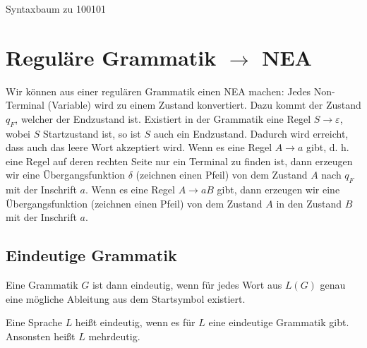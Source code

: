 \documentclass{lehramt-informatik-haupt}
\begin{document}
Syntaxbaum zu 100101
\begin{center}
\end{center}

%

\section{Reguläre Grammatik $\rightarrow$ NEA}

Wir können aus einer regulären Grammatik einen NEA machen: Jedes
Non-Terminal (Variable) wird zu einem Zustand konvertiert. Dazu kommt
der Zustand $q_{F}$, welcher der Endzustand ist. Existiert in der
Grammatik eine Regel $S \rightarrow \varepsilon$, wobei $S$ Startzustand
ist, so ist $S$ auch ein Endzustand. Dadurch wird erreicht, dass auch
das leere Wort akzeptiert wird. Wenn es eine Regel $A \rightarrow a$
gibt, d. h. eine Regel auf deren rechten Seite nur ein Terminal zu
finden ist, dann erzeugen wir eine Übergangsfunktion $\delta$ (zeichnen
einen Pfeil) von dem Zustand $A$ nach $q_{F}$ mit der Inschrift $a$.
Wenn es eine Regel $A\rightarrow aB$ gibt, dann erzeugen wir eine
Übergangsfunktion (zeichnen einen Pfeil) von dem Zustand $A$ in den
Zustand $B$ mit der Inschrift $a$.

\subsection{Eindeutige Grammatik}

Eine Grammatik $G$ ist dann eindeutig, wenn für jedes Wort aus $L(G)$
genau eine mögliche Ableitung aus dem Startsymbol existiert.

Eine Sprache $L$ heißt eindeutig, wenn es für $L$ eine eindeutige
Grammatik gibt. Ansonsten heißt $L$ mehrdeutig.

%
\end{document}
